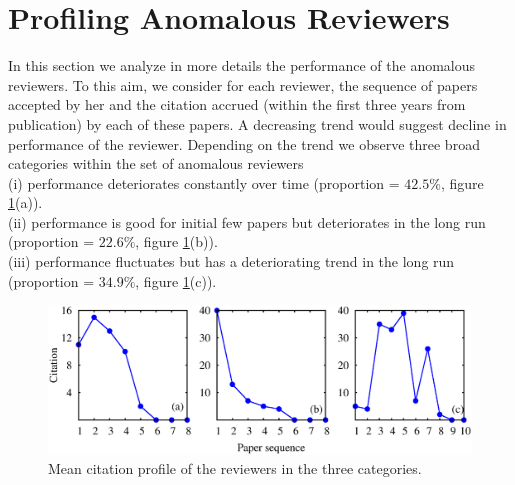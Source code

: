 \noindent
\section{Profiling Anomalous Reviewers}
\label{profile}


In this section we analyze in more details the performance of the anomalous reviewers. To this aim, we consider for each reviewer, the sequence of papers accepted by her and the citation accrued (within the first three years from publication) by each of these papers. A decreasing trend would suggest decline in performance of the reviewer. Depending on the trend we observe three broad categories within the set of anomalous reviewers \\
(i) performance deteriorates constantly over time (proportion = $42.5\%$, figure \ref{cit_prof}(a)).\\
(ii) performance is good for initial few papers but deteriorates in the long run (proportion = $22.6\%$, figure \ref{cit_prof}(b)).\\
(iii) performance fluctuates but has a deteriorating trend in the long run (proportion = $34.9\%$, figure \ref{cit_prof}(c)).
\begin{figure}
\centering
\includegraphics[scale=0.3]{./texfiles/Chapter_4/cikm/figures/profile_all.eps}
\caption{\label{cit_prof} Mean citation profile of the reviewers in the three categories.}
\end{figure}

\medskip